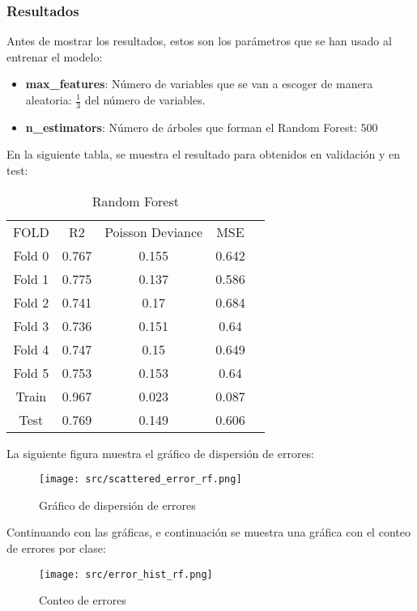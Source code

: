 \subsubsection*{Resultados}
Antes de mostrar los resultados, estos son los parámetros que se han usado al entrenar el modelo:
\begin{itemize}
	\item \textbf{max\_features}:  Número de variables que se van a escoger de manera aleatoria: $\frac{1}{3}$ del número de variables.
	      \item\textbf{n\_estimators}: Número de árboles que forman el Random Forest: $500$
\end{itemize}
En la siguiente tabla, se muestra el resultado para obtenidos en validación y en test:
\linebreak
\begin{table}[H]
	\centering
	\begin{tabular}{|c|c|c|c|c}
		\cline{1-4}
		FOLD   & R2    & Poisson Deviance & MSE   \\ \cline{1-4}
		Fold 0 & 0.767 & 0.155            & 0.642 \\ \cline{1-4}
		Fold 1 & 0.775 & 0.137            & 0.586 \\ \cline{1-4}
		Fold 2 & 0.741 & 0.17             & 0.684 \\ \cline{1-4}
		Fold 3 & 0.736 & 0.151            & 0.64  \\ \cline{1-4}
		Fold 4 & 0.747 & 0.15             & 0.649 \\ \cline{1-4}
		Fold 5 & 0.753 & 0.153            & 0.64  \\ \cline{1-4}
		Train  & 0.967 & 0.023            & 0.087 \\ \cline{1-4}
		Test   & 0.769 & 0.149            & 0.606 \\ \cline{1-4}
	\end{tabular}
	\caption{Random Forest}
	\label{tab:res_random_forest}
\end{table}
La siguiente figura muestra el gráfico de dispersión de errores:\\
\linebreak
\begin{figure}[H]
	\centering
	\texttt{[image: src/scattered\_error\_rf.png]}
	\caption{Gráfico de dispersión de errores}
	\label{fig:rf_scattered}
\end{figure}
Continuando con las gráficas, e continuación se muestra una gráfica con el conteo de errores por clase:
\begin{figure}[H]
	\centering
	\texttt{[image: src/error\_hist\_rf.png]}
	\caption{Conteo de errores}
	\label{fig:rf_error_plot}
\end{figure}
